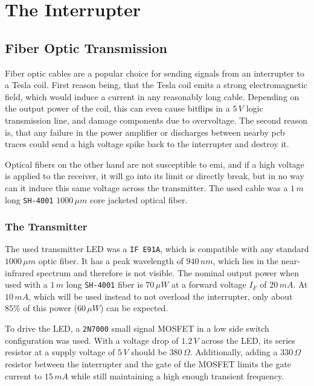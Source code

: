 \section{The Interrupter}

\subsection{Fiber Optic Transmission}


Fiber optic cables are a popular choice for sending signals from an interrupter to a Tesla coil. First reason being, that the Tesla coil emits a strong electromagnetic field, which would induce a current in any reasonably long cable. Depending on the output power of the coil, this can even cause bitflips in a \(5\,V\) logic transmission line, and damage components due to overvoltage. The second reason is, that any failure in the power amplifier or discharges between nearby \gls{pcb} traces could send a high voltage spike back to the interrupter and destroy it.

Optical fibers on the other hand are not susceptible to \gls{emi}, and if a high voltage is applied to the receiver, it will go into its limit or directly break, but in no way can it induce this same voltage across the transmitter. The used cable was a \(1\,m\) long \texttt{SH-4001} \(1000\,\mu m\) core jacketed optical fiber.

\subsubsection{The Transmitter}

The used transmitter LED was a \texttt{IF E91A}, which is compatible with any standard \(1000\,\mu m\) optic fiber. It has a peak wavelength of \(940\,nm\), which lies in the near-infrared spectrum and therefore is not visible. The nominal output power when used with a \(1\,m\) long \texttt{SH-4001} fiber is \(70\,\mu W\) at a forward voltage \(I_F\) of \(20\,mA\). At \(10\,mA\), which will be used instead to not overload the interrupter, only about \(85\%\) of this power (\(60\,\mu W\)) can be expected.

To drive the LED, a \texttt{2N7000} small signal MOSFET in a low side switch configuration was used. With a voltage drop of \(1.2\,V\) across the LED, its series resistor at a supply voltage of \(5\,V\) should be \(380\,\Omega\). Additionally, adding a \(330\,\Omega\) resistor between the interrupter and the gate of the MOSFET limits the gate current to \(15\,mA\) while still maintaining a high enough transient frequency.

